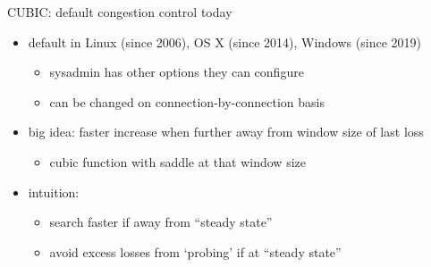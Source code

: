 \begin{frame}{CUBIC: default congestion control today}
    \begin{itemize}
    \item default in Linux (since 2006), OS X (since 2014), Windows (since 2019)
        \begin{itemize}
        \item sysadmin has other options they can configure
        \item can be changed on connection-by-connection basis
        \end{itemize}
    \item big idea: faster increase when further away from window size of last loss
        \begin{itemize}
        \item cubic function with saddle at that window size
        \end{itemize}
    \item intuition: 
        \begin{itemize}
        \item search faster if away from ``steady state''
        \item avoid excess losses from `probing' if at ``steady state''
        \end{itemize}
    \end{itemize}
\end{frame}

\begin{frame}{}
\end{frame}
